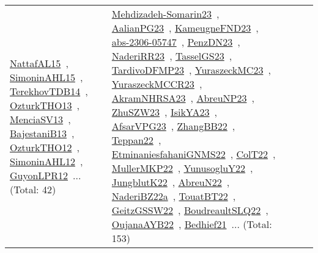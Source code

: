 {\begin{longtable}{lp{3cm}>{\raggedright\arraybackslash}p{6cm}>{\raggedright\arraybackslash}p{6cm}>{\raggedright\arraybackslash}p{8cm}}
\href{../works/NattafAL15.pdf}{NattafAL15}~\cite{NattafAL15}, \href{../works/SimoninAHL15.pdf}{SimoninAHL15}~\cite{SimoninAHL15}, \href{../works/TerekhovTDB14.pdf}{TerekhovTDB14}~\cite{TerekhovTDB14}, \href{../works/OzturkTHO13.pdf}{OzturkTHO13}~\cite{OzturkTHO13}, \href{../works/MenciaSV13.pdf}{MenciaSV13}~\cite{MenciaSV13}, \href{../works/BajestaniB13.pdf}{BajestaniB13}~\cite{BajestaniB13}, \href{../works/OzturkTHO12.pdf}{OzturkTHO12}~\cite{OzturkTHO12}, \href{../works/SimoninAHL12.pdf}{SimoninAHL12}~\cite{SimoninAHL12}, \href{../works/GuyonLPR12.pdf}{GuyonLPR12}~\cite{GuyonLPR12}... (Total: 42) & \href{../works/Mehdizadeh-Somarin23.pdf}{Mehdizadeh-Somarin23}~\cite{Mehdizadeh-Somarin23}, \href{../works/AalianPG23.pdf}{AalianPG23}~\cite{AalianPG23}, \href{../works/KameugneFND23.pdf}{KameugneFND23}~\cite{KameugneFND23}, \href{../works/abs-2306-05747.pdf}{abs-2306-05747}~\cite{abs-2306-05747}, \href{../works/PenzDN23.pdf}{PenzDN23}~\cite{PenzDN23}, \href{../works/NaderiRR23.pdf}{NaderiRR23}~\cite{NaderiRR23}, \href{../works/TasselGS23.pdf}{TasselGS23}~\cite{TasselGS23}, \href{../works/TardivoDFMP23.pdf}{TardivoDFMP23}~\cite{TardivoDFMP23}, \href{../works/YuraszeckMC23.pdf}{YuraszeckMC23}~\cite{YuraszeckMC23}, \href{../works/YuraszeckMCCR23.pdf}{YuraszeckMCCR23}~\cite{YuraszeckMCCR23}, \href{../works/AkramNHRSA23.pdf}{AkramNHRSA23}~\cite{AkramNHRSA23}, \href{../works/AbreuNP23.pdf}{AbreuNP23}~\cite{AbreuNP23}, \href{../works/ZhuSZW23.pdf}{ZhuSZW23}~\cite{ZhuSZW23}, \href{../works/IsikYA23.pdf}{IsikYA23}~\cite{IsikYA23}, \href{../works/AfsarVPG23.pdf}{AfsarVPG23}~\cite{AfsarVPG23}, \href{../works/ZhangBB22.pdf}{ZhangBB22}~\cite{ZhangBB22}, \href{../works/Teppan22.pdf}{Teppan22}~\cite{Teppan22}, \href{../works/EtminaniesfahaniGNMS22.pdf}{EtminaniesfahaniGNMS22}~\cite{EtminaniesfahaniGNMS22}, \href{../works/ColT22.pdf}{ColT22}~\cite{ColT22}, \href{../works/MullerMKP22.pdf}{MullerMKP22}~\cite{MullerMKP22}, \href{../works/YunusogluY22.pdf}{YunusogluY22}~\cite{YunusogluY22}, \href{../works/JungblutK22.pdf}{JungblutK22}~\cite{JungblutK22}, \href{../works/AbreuN22.pdf}{AbreuN22}~\cite{AbreuN22}, \href{../works/NaderiBZ22a.pdf}{NaderiBZ22a}~\cite{NaderiBZ22a}, \href{../works/TouatBT22.pdf}{TouatBT22}~\cite{TouatBT22}, \href{../works/GeitzGSSW22.pdf}{GeitzGSSW22}~\cite{GeitzGSSW22}, \href{../works/BoudreaultSLQ22.pdf}{BoudreaultSLQ22}~\cite{BoudreaultSLQ22}, \href{../works/OujanaAYB22.pdf}{OujanaAYB22}~\cite{OujanaAYB22}, \href{../works/Bedhief21.pdf}{Bedhief21}~\cite{Bedhief21}... (Total: 153)\\

\end{longtable}}
